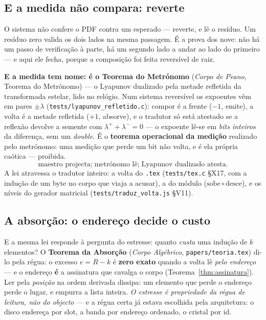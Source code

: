 \documentclass[11pt,a4paper]{article}
\newcommand{\code}[1]{\texttt{\small #1}}
\begin{document}
\subsection*{E a medida não compara: reverte}

O sistema não confere o PDF contra um esperado --- reverte, e lê o resíduo. Um resíduo zero valida
os dois lados na mesma passagem. É a prova dos nove: não há um passo de verificação à parte, há um
segundo lado a andar ao lado do primeiro --- e aqui ele fecha, porque a composição foi feita
reversível de raiz.

\smallskip
\noindent \textbf{E a medida tem nome: é o Teorema do Metrónomo}
(\emph{Corpo de Peano}, Teorema do Metrónomo) --- o Lyapunov dualizado
pela metade refletida da transformada estelar, lido no relógio.
Num sistema reversível os expoentes vêm em pares $\pm\lambda$
(\code{tests/lyapunov\_refletido.c}): compor é a frente ($-1$, emite), a volta é a metade
refletida ($+1$, absorve), e o tradutor só está atestado se a reflexão devolve a semente com
$\lambda^{+}{+}\lambda^{-}=0$ --- o expoente lê-se em \emph{bits inteiros} da diferença, sem um
\emph{double}. É o \textbf{teorema operacional da medição} realizado pelo metrónomo:
uma medição que perde um bit não volta, e é ela própria caótica --- proibida.
\[
\boxed{
\text{maestro projecta;}
\;
\text{metrónomo lê;}
\;
\text{Lyapunov dualizado atesta.}
}
\]
A lei atravessa o tradutor inteiro: a volta do
\code{.tex} (\code{tests/tex.c} \S X17, com a indução de um byte no corpo que viaja a acusar),
a do módulo ($\mathrm{sobe}\circ\mathrm{desce}$), e os níveis do gerador matricial
(\code{tests/traduz\_volta.js} \S V11).

\subsection*{A absorção: o endereço decide o custo}

E a mesma lei responde à pergunta do estresse: quanto \emph{custa} uma
indução de $k$ elementos? O \textbf{Teorema da Absorção}
(\emph{Corpo Algébrico}, \code{papers/teoria.tex}) di-lo pela régua: o excesso
$e=R-k$ é \textbf{zero exato} quando a volta lê \emph{pelo endereço} ---
e o endereço \textbf{é} a assinatura que cavalga o corpo
(Teorema~\ref{thm:assinatura}). Ler pela \emph{posição} na ordem
derivada dissipa: um elemento que perde o endereço perde o lugar, e
empurra a lista inteira. \emph{O estresse é propriedade da régua de
leitura, não do objecto} --- e a régua certa já estava escolhida pela
arquitetura: o disco endereça por slot, a banda por endereço ordenado,
o cristal por id.
\end{document}
